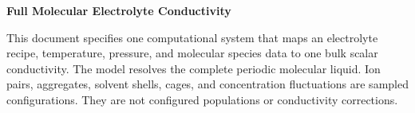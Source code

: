 \documentclass[10pt]{article}
\begin{document}
\noindent\colorbox{lithioxbggreen!15}{%
\hspace{10pt}\begin{minipage}{\dimexpr\textwidth-2\fboxsep-20pt}
\vspace{10pt}
{\LARGE\sffamily\bfseries\color{lithioxfontblue} Full Molecular Electrolyte Conductivity}
\vspace{4pt}\RaggedRight

This document specifies one computational system that maps an electrolyte recipe,
temperature, pressure, and molecular species data to one bulk scalar conductivity.
The model resolves the complete periodic molecular liquid. Ion pairs, aggregates,
solvent shells, cages, and concentration fluctuations are sampled configurations.
They are not configured populations or conductivity corrections.
\vspace{10pt}
\end{minipage}\hspace{10pt}}
\end{document}
